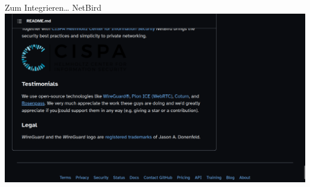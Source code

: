 \documentclass{rosenpass-beamer}
\begin{document}
\begin{frame}{Zum Integrieren… NetBird}
  \includegraphics[height=.9\textheight]{assets/2023-09-02-netbird-gh-rosenpass-testemonial.png}
\end{frame}
\end{document}
